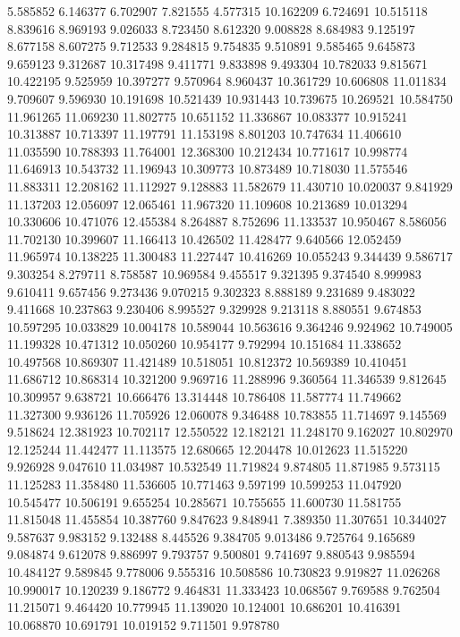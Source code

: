5.585852
6.146377
6.702907
7.821555
4.577315
10.162209
6.724691
10.515118
8.839616
8.969193
9.026033
8.723450
8.612320
9.008828
8.684983
9.125197
8.677158
8.607275
9.712533
9.284815
9.754835
9.510891
9.585465
9.645873
9.659123
9.312687
10.317498
9.411771
9.833898
9.493304
10.782033
9.815671
10.422195
9.525959
10.397277
9.570964
8.960437
10.361729
10.606808
11.011834
9.709607
9.596930
10.191698
10.521439
10.931443
10.739675
10.269521
10.584750
11.961265
11.069230
11.802775
10.651152
11.336867
10.083377
10.915241
10.313887
10.713397
11.197791
11.153198
8.801203
10.747634
11.406610
11.035590
10.788393
11.764001
12.368300
10.212434
10.771617
10.998774
11.646913
10.543732
11.196943
10.309773
10.873489
10.718030
11.575546
11.883311
12.208162
11.112927
9.128883
11.582679
11.430710
10.020037
9.841929
11.137203
12.056097
12.065461
11.967320
11.109608
10.213689
10.013294
10.330606
10.471076
12.455384
8.264887
8.752696
11.133537
10.950467
8.586056
11.702130
10.399607
11.166413
10.426502
11.428477
9.640566
12.052459
11.965974
10.138225
11.300483
11.227447
10.416269
10.055243
9.344439
9.586717
9.303254
8.279711
8.758587
10.969584
9.455517
9.321395
9.374540
8.999983
9.610411
9.657456
9.273436
9.070215
9.302323
8.888189
9.231689
9.483022
9.411668
10.237863
9.230406
8.995527
9.329928
9.213118
8.880551
9.674853
10.597295
10.033829
10.004178
10.589044
10.563616
9.364246
9.924962
10.749005
11.199328
10.471312
10.050260
10.954177
9.792994
10.151684
11.338652
10.497568
10.869307
11.421489
10.518051
10.812372
10.569389
10.410451
11.686712
10.868314
10.321200
9.969716
11.288996
9.360564
11.346539
9.812645
10.309957
9.638721
10.666476
13.314448
10.786408
11.587774
11.749662
11.327300
9.936126
11.705926
12.060078
9.346488
10.783855
11.714697
9.145569
9.518624
12.381923
10.702117
12.550522
12.182121
11.248170
9.162027
10.802970
12.125244
11.442477
11.113575
12.680665
12.204478
10.012623
11.515220
9.926928
9.047610
11.034987
10.532549
11.719824
9.874805
11.871985
9.573115
11.125283
11.358480
11.536605
10.771463
9.597199
10.599253
11.047920
10.545477
10.506191
9.655254
10.285671
10.755655
11.600730
11.581755
11.815048
11.455854
10.387760
9.847623
9.848941
7.389350
11.307651
10.344027
9.587637
9.983152
9.132488
8.445526
9.384705
9.013486
9.725764
9.165689
9.084874
9.612078
9.886997
9.793757
9.500801
9.741697
9.880543
9.985594
10.484127
9.589845
9.778006
9.555316
10.508586
10.730823
9.919827
11.026268
10.990017
10.120239
9.186772
9.464831
11.333423
10.068567
9.769588
9.762504
11.215071
9.464420
10.779945
11.139020
10.124001
10.686201
10.416391
10.068870
10.691791
10.019152
9.711501
9.978780
